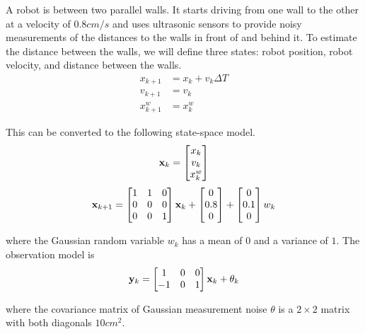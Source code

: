A robot is between two parallel walls. It starts driving from one wall to the
other at a velocity of $0.8 cm/s$ and uses ultrasonic sensors to provide noisy
measurements of the distances to the walls in front of and behind it. To
estimate the distance between the walls, we will define three \glspl{state}:
robot position, robot velocity, and distance between the walls.
\begin{align}
  x_{k+1} &= x_k + v_k \Delta T \\
  v_{k+1} &= v_k \\
  x_{k+1}^w &= x_k^w
\end{align}

This can be converted to the following state-space \gls{model}.
\begin{equation}
  \mathbf{x}_k =
  \begin{bmatrix}
    x_k \\
    v_k \\
    x_k^w
  \end{bmatrix}
\end{equation}
\begin{equation}
  \mathbf{x}_{k+1} =
  \begin{bmatrix}
    1 & 1 & 0 \\
    0 & 0 & 0 \\
    0 & 0 & 1
  \end{bmatrix} \mathbf{x}_k +
  \begin{bmatrix}
    0 \\
    0.8 \\
    0
  \end{bmatrix} +
  \begin{bmatrix}
    0 \\
    0.1 \\
    0
  \end{bmatrix} w_k
\end{equation}

where the Gaussian random variable $w_k$ has a mean of $0$ and a variance of
$1$. The observation \gls{model} is
\begin{equation}
  \mathbf{y}_k =
  \begin{bmatrix}
    1 & 0 & 0 \\
    -1 & 0 & 1
  \end{bmatrix} \mathbf{x}_k + \theta_k
\end{equation}

where the covariance matrix of Gaussian measurement noise $\theta$ is a
$2 \times 2$ matrix with both diagonals $10 cm^2$.

